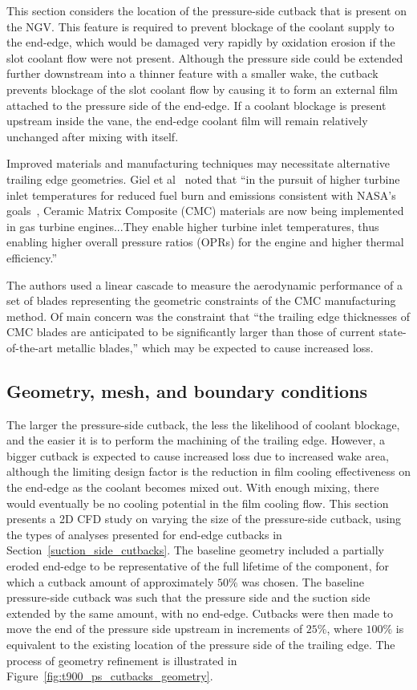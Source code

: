 \documentclass[a4paper, 11pt, oneside]{report}
\begin{document}
This section considers the location of the pressure-side cutback that is present on the NGV. This feature is required to prevent blockage of the coolant supply to the end-edge, which would be damaged very rapidly by oxidation erosion if the slot coolant flow were not present. Although the pressure side could be extended further downstream into a thinner feature with a smaller wake, the cutback prevents blockage of the slot coolant flow by causing it to form an external film attached to the pressure side of the end-edge. If a coolant blockage is present upstream inside the vane, the end-edge coolant film will remain relatively unchanged after mixing with itself.

Improved materials and manufacturing techniques may necessitate alternative trailing edge geometries. Giel et al~\cite{giel_te_thickness} noted that ``in the pursuit of higher turbine inlet temperatures for reduced fuel burn and emissions consistent with NASA's goals~\cite{giel_nasa_reference}, Ceramic Matrix Composite (CMC) materials are now being implemented in gas turbine engines...They enable higher turbine inlet temperatures, thus enabling higher overall pressure ratios (OPRs) for the engine and higher thermal efficiency.'' 

The authors used a linear cascade to measure the aerodynamic performance of a set of blades representing the geometric constraints of the CMC manufacturing method. Of main concern was the constraint that ``the trailing edge thicknesses of CMC blades are anticipated to be significantly larger than those of current state-of-the-art metallic blades,'' which may be expected to cause increased loss.

\subsection{Geometry, mesh, and boundary conditions}

The larger the pressure-side cutback, the less the likelihood of coolant blockage, and the easier it is to perform the machining of the trailing edge. However, a bigger cutback is expected to cause increased loss due to increased wake area, although the limiting design factor is the reduction in film cooling effectiveness on the end-edge as the coolant becomes mixed out. With enough mixing, there would eventually be no cooling potential in the film cooling flow. This section presents a 2D CFD study on varying the size of the pressure-side cutback, using the types of analyses presented for end-edge cutbacks in Section~\ref{suction_side_cutbacks}. The baseline geometry included a partially eroded end-edge to be representative of the full lifetime of the component, for which a cutback amount of approximately $50\%$ was chosen. The baseline pressure-side cutback was such that the pressure side and the suction side extended by the same amount, with no end-edge. Cutbacks were then made to move the end of the pressure side upstream in increments of $25\%$, where $100\%$ is equivalent to the existing location of the pressure side of the trailing edge. The process of geometry refinement is illustrated in Figure~\ref{fig:t900_ps_cutbacks_geometry}.
\end{document}
